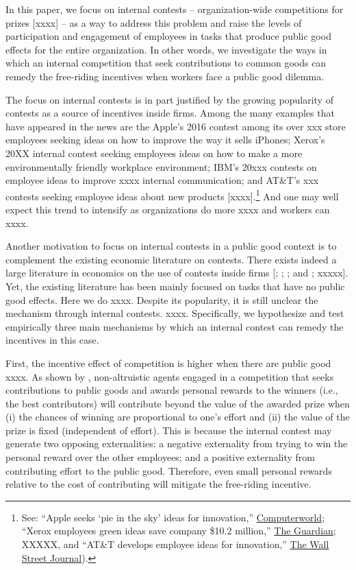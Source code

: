 \documentclass[12pt, titlepage]{article}
\begin{document}
In this paper, we focus on internal contests -- organization-wide
competitions for prizes {[}xxxx{]} -- as a way to address this problem
and raise the levels of participation and engagement of employees in
tasks that produce public good effects for the entire organization. In
other words, we investigate the ways in which an internal competition
that seek contributions to common goods can remedy the free-riding
incentives when workers face a public good dilemma.

The focus on internal contests is in part justified by the growing
popularity of contests as a source of incentives inside firms. Among the
many examples that have appeared in the news are the Apple's 2016
contest among its over xxx store employees seeking ideas on how to
improve the way it sells iPhones; Xerox's 20XX internal contest seeking
employees ideas on how to make a more environmentally friendly workplace
environment; IBM's 20xxx contests on employee ideas to improve xxxx
internal communication; and AT\&T's xxx contests seeking employee ideas
about new products {[}xxxx{]}.\footnote{See: ``Apple seeks `pie in the
  sky' ideas for innovation,''
  \href{http://www.computerworld.com/article/2474058/smartphones/apple-seeks--pie-in-the-sky--ideas-for-innovation}{Computerworld};
  ``Xerox employees green ideas save company \$10.2 million,''
  \href{http://www.theguardian.com/sustainable-business/xerox-employees-green-ideas-save}{The
  Guardian}; XXXXX, and ``AT\&T develops employee ideas for
  innovation,''
  \href{http://blogs.wsj.com/cio/2014/11/12/att-develops-employee-ideas-for-innovation}{The
  Wall Street Journal}).} And one may well expect this trend to
intensify as organizations do more xxxx and workers can xxxx.

Another motivation to focus on internal contests in a public good
context is to complement the existing economic literature on contests.
There exists indeed a large literature in economics on the use of
contests inside firms {[}\citet{lazear1981rank};
\citet{green1983comparison}; \citet{nalebuff1983prizes}; and
\citet{mary1984economic}; xxxxx{]}. Yet, the existing literature has
been mainly focused on tasks that have no public good effects. Here we
do xxxx. Despite its popularity, it is still unclear the mechanism
through internal contests. xxxx. Specifically, we hypothesize and test
empirically three main mechanisms by which an internal contest can
remedy the incentives in this case.

First, the incentive effect of competition is higher when there are
public good xxxx. As shown by \citet{morgan2000financing},
non-altruistic agents engaged in a competition that seeks contributions
to public goods and awards personal rewards to the winners (i.e., the
best contributors) will contribute beyond the value of the awarded prize
when (i) the chances of winning are proportional to one's effort and
(ii) the value of the prize is fixed (independent of effort). This is
because the internal contest may generate two opposing externalities: a
negative externality from trying to win the personal reward over the
other employees; and a positive externality from contributing effort to
the public good. Therefore, even small personal rewards relative to the
cost of contributing will mitigate the free-riding incentive.
\end{document}
